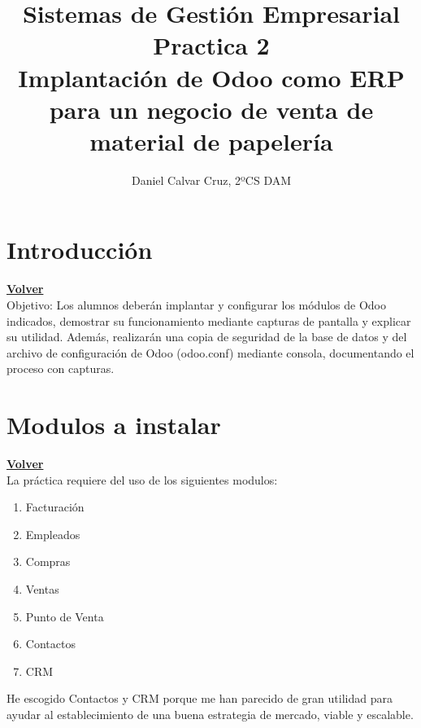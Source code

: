 \documentclass[a4paper,12pt]{article}
\title{\textbf{Sistemas de Gestión Empresarial}\\[1em]\textbf{Practica 2}\\[1em]Implantación de Odoo como ERP para un negocio de venta de material de
papelería}
\author{Daniel Calvar Cruz, 2ºCS DAM}
\date{}
\begin{document}
\maketitle
\clearpage
\hypertarget{anchor-indice}{}
\tableofcontents
\newpage

\section{Introducción}
\hyperlink{anchor-indice}{\textbf{Volver}}\\

Objetivo:
Los alumnos deberán implantar y configurar los módulos de Odoo indicados,
demostrar su funcionamiento mediante capturas de pantalla y explicar su utilidad.
Además, realizarán una copia de seguridad de la base de datos y del archivo de
configuración de Odoo (odoo.conf) mediante consola, documentando el proceso con
capturas.


\section{Modulos a instalar}
\hyperlink{anchor-indice}{\textbf{Volver}}\\

La práctica requiere del uso de los siguientes modulos: 
\begin{enumerate}
    \item Facturación
    \item Empleados
    \item Compras
    \item Ventas
    \item Punto de Venta
    \item Contactos
    \item CRM
\end{enumerate}

He escogido Contactos y CRM porque me han parecido de gran utilidad para ayudar al establecimiento de una buena estrategia de mercado, viable y escalable.
\end{document}
